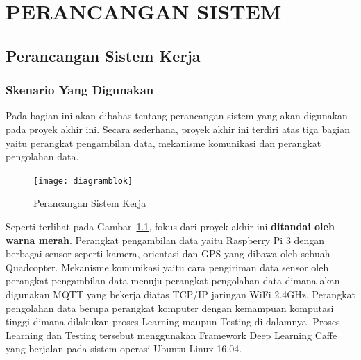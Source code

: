 \chapter{PERANCANGAN SISTEM}

\ifpdf
    \graphicspath{{Chapter3/Figs/Raster/}{Chapter3/Figs/PDF/}{Chapter3/Figs/}}
\else
    \graphicspath{{Chapter3/Figs/Vector/}{Chapter3/Figs/}}
\fi

\section{ Perancangan Sistem Kerja}
\subsection{ Skenario Yang Digunakan}
Pada bagian ini akan dibahas tentang perancangan sistem yang akan digunakan pada proyek akhir ini. Secara sederhana, proyek akhir ini terdiri atas tiga bagian yaitu perangkat pengambilan data, mekanisme komunikasi dan perangkat pengolahan data. 


\begin{figure}[ht]
 \centering
 \texttt{[image: diagramblok]}
 \caption{Perancangan Sistem Kerja}
 \label{fig:diagramblok}   
\end{figure}

Seperti terlihat pada Gambar~\ref{fig:diagramblok}, fokus dari proyek akhir ini \textbf{ditandai oleh warna merah}. Perangkat pengambilan data yaitu Raspberry Pi 3 dengan berbagai sensor seperti kamera, orientasi dan GPS yang dibawa oleh sebuah Quadcopter. Mekanisme komunikasi yaitu cara pengiriman data sensor oleh perangkat pengambilan data menuju perangkat pengolahan data dimana akan digunakan MQTT yang bekerja diatas TCP/IP jaringan WiFi 2.4GHz. Perangkat pengolahan data berupa perangkat komputer dengan kemampuan komputasi tinggi dimana dilakukan proses Learning maupun Testing di dalamnya. Proses Learning dan Testing tersebut menggunakan Framework Deep Learning Caffe yang berjalan pada sistem operasi Ubuntu Linux 16.04.

